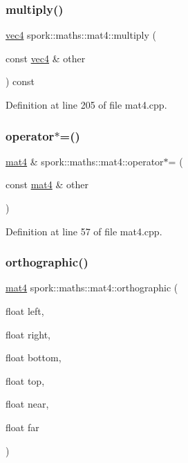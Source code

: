 \subsubsection{\texorpdfstring{multiply()}{multiply()}\hspace{0.1cm}{\footnotesize\ttfamily [3/3]}}
{\footnotesize\ttfamily \hyperlink{structspork_1_1maths_1_1vec4}{vec4} spork\+::maths\+::mat4\+::multiply (\begin{DoxyParamCaption}\item[{const \hyperlink{structspork_1_1maths_1_1vec4}{vec4} \&}]{other }\end{DoxyParamCaption}) const}



Definition at line 205 of file mat4.\+cpp.

\mbox{\label{structspork_1_1maths_1_1mat4_a706a4d4c7946d3470af94b2466be3b6e}} 
\subsubsection{\texorpdfstring{operator$\ast$=()}{operator*=()}}
{\footnotesize\ttfamily \hyperlink{structspork_1_1maths_1_1mat4}{mat4} \& spork\+::maths\+::mat4\+::operator$\ast$= (\begin{DoxyParamCaption}\item[{const \hyperlink{structspork_1_1maths_1_1mat4}{mat4} \&}]{other }\end{DoxyParamCaption})}



Definition at line 57 of file mat4.\+cpp.

\mbox{\label{structspork_1_1maths_1_1mat4_a689cf66fadd19f1be45c3096a09044fc}} 
\subsubsection{\texorpdfstring{orthographic()}{orthographic()}}
{\footnotesize\ttfamily \hyperlink{structspork_1_1maths_1_1mat4}{mat4} spork\+::maths\+::mat4\+::orthographic (\begin{DoxyParamCaption}\item[{float}]{left,  }\item[{float}]{right,  }\item[{float}]{bottom,  }\item[{float}]{top,  }\item[{float}]{near,  }\item[{float}]{far }\end{DoxyParamCaption})\hspace{0.3cm}{\ttfamily [static]}}



